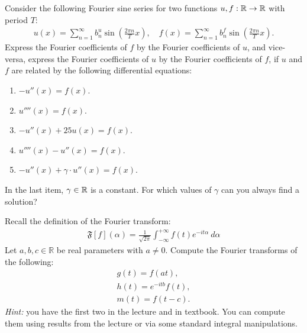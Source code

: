 \documentclass[11pt]{article}
\begin{document}
\begin{exercise}
    Consider the following Fourier sine series for two functions $u, f : \mathbb{R} \to \mathbb{R}$ with period $T$:
    \begin{align*}
        u(x) = \sum_{n=1}^{\infty} b_{n}^{u} \sin\left( \frac{2\pi n}{T} x \right)
        ,
        \quad 
        f(x) = \sum_{n=1}^{\infty} b_{n}^{f} \sin\left( \frac{2\pi n}{T} x \right)
        .
    \end{align*}
    Express the Fourier coefficients of $f$ by the Fourier coefficients of $u$, and vice-versa, express the Fourier coefficients of $u$ by the Fourier coefficients of $f$,
    if $u$ and $f$ are related by the following differential equations:
    \begin{enumerate}[label=(\alph*)]
     \item 
     $-u''(x) = f(x)$.
     \item 
     $u''''(x) = f(x)$.
     \item 
     $-u''(x) + 25 u(x) = f(x)$.
     \item 
     $u''''(x) - u''(x) = f(x)$.
     \item 
     $-u''(x) + \gamma \cdot u''(x) = f(x)$.
    \end{enumerate}
    In the last item, $\gamma \in \mathbb{R}$ is a constant. For which values of $\gamma$ can you always find a solution?
\end{exercise}
\begin{solution}     
\end{solution}





\begin{exercise}
    Recall the definition of the Fourier transform:
    \begin{align}
        \mathfrak{F}[f](\alpha) = \frac{1}{\sqrt{2\pi}} \int_{-\infty}^{+\infty} f(t) e^{-it\alpha} \ d\alpha
    \end{align}
    Let $a,b,c \in \mathbb R$ be real parameters with $a \neq 0$. Compute the Fourier transforms of the following:
    \begin{align}
        g(t) = f( a t ),
        \\
        h(t) = e^{-i t b} f(t),
        \\
        m(t) = f( t - c ).
    \end{align}
    \textit{Hint: } you have the first two in the lecture and in textbook. You can compute them using results from the lecture or via some standard integral manipulations. 
\end{exercise}
\end{document}
